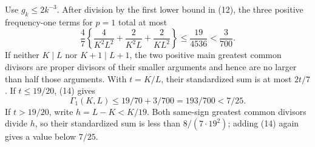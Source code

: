Use \(g_k\leq2k^{-3}\).  After division by the first lower bound in (12), the three positive frequency-one terms for \(p=1\) total at most
\[
 \frac47\left\{\frac4{K^2L^2}+\frac2{K^2L}+\frac2{KL^2}\right\}
 \leq\frac{19}{4536}<\frac3{700}.                                               \tag{14}
\]
If neither \(K\mid L\) nor \(K+1\mid L+1\), the two positive main greatest common divisors are proper divisors of their smaller arguments and hence are no larger than half those arguments.  With \(t=K/L\), their standardized sum is at most \(2t/7\).  If \(t\leq19/20\), (14) gives
\[
 \Gamma_1(K,L)\leq19/70+3/700=193/700<7/25.                                    \tag{15}
\]
If \(t>19/20\), write \(h=L-K<K/19\).  Both same-sign greatest common divisors divide \(h\), so their standardized sum is less than \(8/(7\cdot19^2)\); adding (14) again gives a value below \(7/25\).

